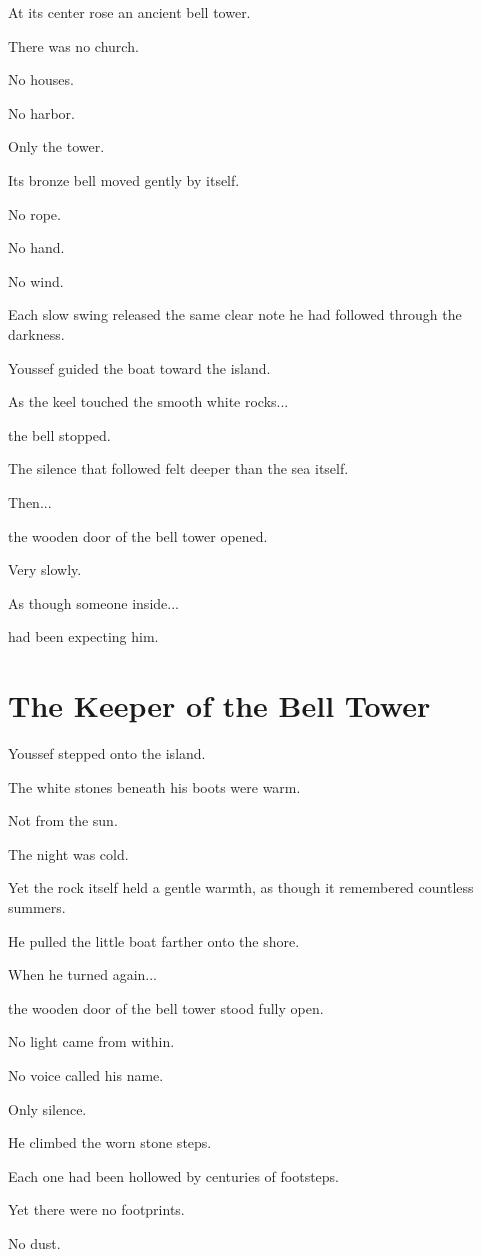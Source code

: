 \documentclass[12pt,openany]{book}
\begin{document}
At its center rose an ancient bell tower.

There was no church.

No houses.

No harbor.

Only the tower.

Its bronze bell moved gently by itself.

No rope.

No hand.

No wind.

Each slow swing released the same clear note he had followed through the darkness.

Youssef guided the boat toward the island.

As the keel touched the smooth white rocks...

the bell stopped.

The silence that followed felt deeper than the sea itself.

Then...

the wooden door of the bell tower opened.

Very slowly.

As though someone inside...

had been expecting him.
\section*{The Keeper of the Bell Tower}

Youssef stepped onto the island.

The white stones beneath his boots were warm.

Not from the sun.

The night was cold.

Yet the rock itself held a gentle warmth, as though it remembered countless summers.

He pulled the little boat farther onto the shore.

When he turned again...

the wooden door of the bell tower stood fully open.

No light came from within.

No voice called his name.

Only silence.

He climbed the worn stone steps.

Each one had been hollowed by centuries of footsteps.

Yet there were no footprints.

No dust.
\end{document}
